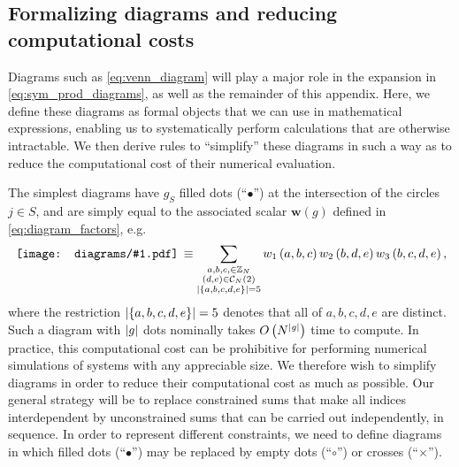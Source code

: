 \documentclass[nofootinbib,notitlepage,11pt]{revtex4-2}
\newcommand{\p}[1]{\left(#1\right)} %
\renewcommand{\set}[1]{\left\{#1\right\}} %
\newcommand{\m}{\bm} %
\newcommand{\1}{\mathds{1}}
\newcommand{\C}{\mathcal{C}}
\newcommand{\ZZ}{\mathbb{Z}}
\newcommand{\diagram}[1]
{\,\texttt{[image: diagrams/\#1.pdf]}\,}
\begin{document}
\subsection{Formalizing diagrams and reducing computational costs}
\label{sec:diagrams}

Diagrams such as \eqref{eq:venn_diagram} will play a major role in the
expansion in \eqref{eq:sym_prod_diagrams}, as well as the remainder of
this appendix.  Here, we define these diagrams as formal objects that
we can use in mathematical expressions, enabling us to systematically
perform calculations that are otherwise intractable.  We then derive
rules to ``simplify'' these diagrams in such a way as to reduce the
computational cost of their numerical evaluation.

The simplest diagrams have $g_S$ filled dots (``$\bullet$'') at the
intersection of the circles $j\in S$, and are simply equal to the
associated scalar $\m w\p{g}$ defined in \eqref{eq:diagram_factors},
e.g.
\begin{align}
  \diagram{example_123}
  \equiv \sum_{\substack{a,b,c,\in\ZZ_N\\\p{d,e}\in\C_N\p{2}\\
      \abs{\set{a,b,c,d,e}}=5}}
  w_1\p{a,b,c} w_2\p{b,d,e} w_3\p{b,c,d,e},
\end{align}
where the restriction $\abs{\set{a,b,c,d,e}}=5$ denotes that all of
$a,b,c,d,e$ are distinct.  Such a diagram with $\abs{g}$ dots
nominally takes $O\p{N^{\abs{g}}}$ time to compute.  In practice, this
computational cost can be prohibitive for performing numerical
simulations of systems with any appreciable size.  We therefore wish
to simplify diagrams in order to reduce their computational cost as
much as possible.  Our general strategy will be to replace constrained
sums that make all indices interdependent by unconstrained sums that
can be carried out independently, in sequence.  In order to represent
different constraints, we need to define diagrams in which filled dots
(``$\bullet$'') may be replaced by empty dots (``$\circ$'') or crosses
(``$\bm\times$'').
\end{document}
